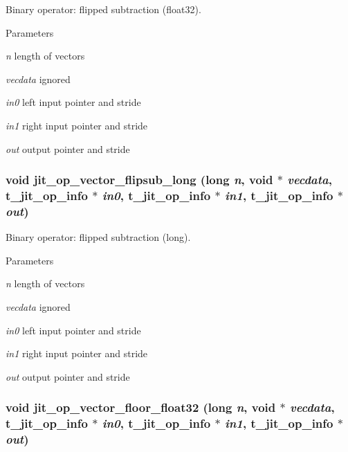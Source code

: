 Binary operator: flipped subtraction (float32). 
\begin{DoxyParams}{Parameters}
\item[{\em n}]length of vectors \item[{\em vecdata}]ignored \item[{\em in0}]left input pointer and stride \item[{\em in1}]right input pointer and stride \item[{\em out}]output pointer and stride \end{DoxyParams}
\hypertarget{group__opvecmod_gaac636c8abca5ee168c14e535fca9eb78}{
\subsubsection[{jit\_\-op\_\-vector\_\-flipsub\_\-long}]{\setlength{\rightskip}{0pt plus 5cm}void jit\_\-op\_\-vector\_\-flipsub\_\-long (long {\em n}, \/  void $\ast$ {\em vecdata}, \/  {\bf t\_\-jit\_\-op\_\-info} $\ast$ {\em in0}, \/  {\bf t\_\-jit\_\-op\_\-info} $\ast$ {\em in1}, \/  {\bf t\_\-jit\_\-op\_\-info} $\ast$ {\em out})}}
\label{group__opvecmod_gaac636c8abca5ee168c14e535fca9eb78}


Binary operator: flipped subtraction (long). 
\begin{DoxyParams}{Parameters}
\item[{\em n}]length of vectors \item[{\em vecdata}]ignored \item[{\em in0}]left input pointer and stride \item[{\em in1}]right input pointer and stride \item[{\em out}]output pointer and stride \end{DoxyParams}
\hypertarget{group__opvecmod_gadaa5adf436030792049ca43566a6894c}{
\subsubsection[{jit\_\-op\_\-vector\_\-floor\_\-float32}]{\setlength{\rightskip}{0pt plus 5cm}void jit\_\-op\_\-vector\_\-floor\_\-float32 (long {\em n}, \/  void $\ast$ {\em vecdata}, \/  {\bf t\_\-jit\_\-op\_\-info} $\ast$ {\em in0}, \/  {\bf t\_\-jit\_\-op\_\-info} $\ast$ {\em in1}, \/  {\bf t\_\-jit\_\-op\_\-info} $\ast$ {\em out})}}
\label{group__opvecmod_gadaa5adf436030792049ca43566a6894c}


